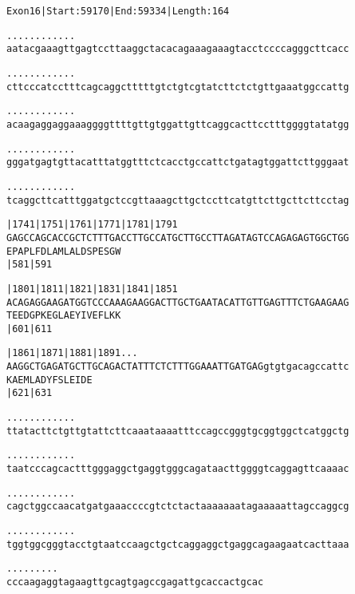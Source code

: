 \documentclass{article}
\begin{document}
\begin{alltt}
Exon 16 | Start: 59170 | End: 59334 | Length: 164

.    .    .    .    .    .    .    .    .    .    .    .    
aatacgaaagttgagtccttaaggctacacagaaagaaagtacctccccagggcttcacc

.    .    .    .    .    .    .    .    .    .    .    .    
cttcccatcctttcagcaggctttttgtctgtcgtatcttctctgttgaaatggccattg

.    .    .    .    .    .    .    .    .    .    .    .    
acaagaggaggaaaggggttttgttgtggattgttcaggcacttcctttggggtatatgg

.    .    .    .    .    .    .    .    .    .    .    .    
gggatgagtgttacatttatggtttctcacctgccattctgatagtggattcttgggaat

.    .    .    .    .    .    .    .    .    .    .    .    
tcaggcttcatttggatgctccgttaaagcttgctccttcatgttcttgcttcttcctag

         |1741     |1751     |1761     |1771     |1781     |1791
GAGCCAGCACCGCTCTTTGACCTTGCCATGCTTGCCTTAGATAGTCCAGAGAGTGGCTGG
E  P  A  P  L  F  D  L  A  M  L  A  L  D  S  P  E  S  G  W  
         |581                          |591                 

         |1801     |1811     |1821     |1831     |1841     |1851
ACAGAGGAAGATGGTCCCAAAGAAGGACTTGCTGAATACATTGTTGAGTTTCTGAAGAAG
T  E  E  D  G  P  K  E  G  L  A  E  Y  I  V  E  F  L  K  K  
         |601                          |611                 

         |1861     |1871     |1881     |1891     .    .    .
AAGGCTGAGATGCTTGCAGACTATTTCTCTTTGGAAATTGATGAGgtgtgacagccattc
K  A  E  M  L  A  D  Y  F  S  L  E  I  D  E                 
         |621                          |631                 

    .    .    .    .    .    .    .    .    .    .    .    .
ttatacttctgttgtattcttcaaataaaatttccagccgggtgcggtggctcatggctg

    .    .    .    .    .    .    .    .    .    .    .    .
taatcccagcactttgggaggctgaggtgggcagataacttggggtcaggagttcaaaac

    .    .    .    .    .    .    .    .    .    .    .    .
cagctggccaacatgatgaaaccccgtctctactaaaaaaatagaaaaattagccaggcg

    .    .    .    .    .    .    .    .    .    .    .    .
tggtggcgggtacctgtaatccaagctgctcaggaggctgaggcagaagaatcacttaaa

\end{alltt}
\newpage
\begin{alltt}
    .    .    .    .    .    .    .    .    .
cccaagaggtagaagttgcagtgagccgagattgcaccactgcac
\end{alltt}
\end{document}
